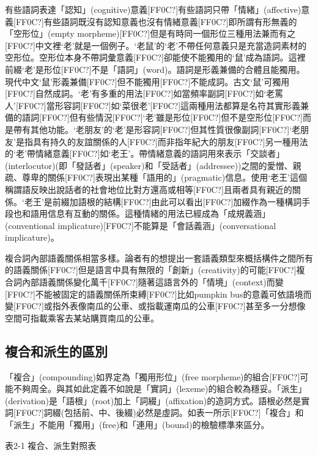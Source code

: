 \textrm{有些語詞表達「認知」(cognitive)意義[FF0C?]有些語詞只帶「情緒」(affective)意義[FF0C?]有些語詞既沒有認知意義也沒有情緒意義[FF0C?]即所謂有形無義的「空形位」(empty morpheme)[FF0C?]但是有時同一個形位三種用法兼而有之[FF0C?]中文裡‘老’就是一個例子。‘老鼠’的‘老’不帶任何意義只是充當造詞素材的空形位。空形位本身不帶詞彙意義[FF0C?]卻能使不能獨用的‘鼠’成為語詞。這裡前綴‘老’是形位[FF0C?]不是「語詞」(word)。語詞是形義兼備的合體且能獨用。現代中文‘鼠’形義兼備[FF0C?]但不能獨用[FF0C?]不能成詞。古文‘鼠’可獨用[FF0C?]自然成詞。‘老’有多重的用法[FF0C?]如當頻率副詞[FF0C?]如‘老罵人’}[FF0C?]\textrm{當形容詞[FF0C?]如‘菜很老’}[FF0C?]\textrm{這兩種用法都算是名符其實形義兼備的語詞[FF0C?]但有些情況[FF0C?]‘老’雖是形位[FF0C?]但不是空形位[FF0C?]而是帶有其他功能。‘老朋友’的‘老’是形容詞[FF0C?]但其性質很像副詞[FF0C?]‘老朋友’是指具有持久的友誼關係的人[FF0C?]而非指年紀大的朋友[FF0C?]另一種用法的‘老’帶情緒意義[FF0C?]如‘老王’}。\textrm{帶情緒意義的語詞用來表示「交談者」(interlocutor)(即「發話者」(speaker)和「受話者」(addressee))之間的愛憎、親疏、尊卑的關係[FF0C?]表現出某種「語用的」(pragmatic)信息。使用‘老王’這個稱謂語反映出說話者的社會地位比對方還高或相等[FF0C?]且兩者具有親近的關係。‘老王’是前綴加語根的結構[FF0C?]由此可以看出[FF0C?]加綴作為一種構詞手段也和語用信息有互動的關係。這種情緒的用法已經成為「成規義涵」(conventional implicature)[FF0C?]不能算是「會話義涵」(conversational implicature)。}

\textrm{複合詞內部語義關係相當多樣。論者有的想提出一套語義類型來概括構件之間所有的語義關係[FF0C?]但是語言中具有無限的「創新」(creativity)的可能[FF0C?]複合詞內部語義關係變化萬千[FF0C?]隨著這語言外的「情境」(context)而變[FF0C?]不能被固定的語義關係所束縛[FF0C?]比如pumpkin bus的意義可依語境而變[FF0C?]或指外表像南瓜的公車、或指載運南瓜的公車[FF0C?]甚至多一分想像空間可指載乘客去某站購買南瓜的公車。}

\subsection{ 複合和派生的區別}

\textrm{「複合」(compounding)如界定為「獨用形位」(free morpheme)的組合[FF0C?]可能不夠周全。與其如此定義不如說是「實詞」(lexeme)的組合較為穩妥。「派生」(derivation)是「語根」(root)加上「詞綴」(affixation)的造詞方式。語根必然是實詞[FF0C?]詞綴(包括前、中、後綴)必然是虛詞。如表一所示[FF0C?]「複合」和「派生」不能用「獨用」(free)和「連用」(bound)的檢驗標準來區分。}

\textrm{表2-1 複合、}派生對照表

\tablefirsthead{}

